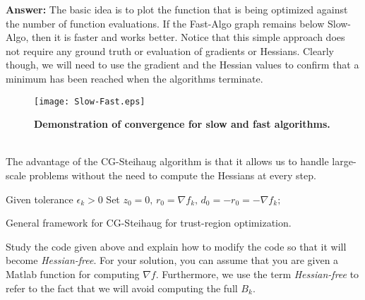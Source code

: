 \documentclass[12pt,legalpaper]{article}
\begin{document}
{\bf Answer:} The basic idea is to plot the function that is being optimized against the number of function evaluations.
If the {\rm Fast-Algo} graph remains below {\rm Slow-Algo}, then it is faster and works better. Notice that this simple approach
does not require any ground truth or evaluation of gradients or Hessians. Clearly though, we will need to use the gradient and the Hessian 
values to confirm that a minimum has been reached when the algorithms terminate.
\begin{figure}[htbp]
\begin{center}
\texttt{[image: Slow-Fast.eps]}
\caption{{\bf Demonstration of convergence for slow and fast algorithms.}}
\label{default}
\end{center}
\end{figure}
\newpage
{}\\
The advantage of the CG-Steihaug algorithm is that it allows us to handle large-scale problems without
   the need to compute the Hessians at every step.
        
\IncMargin{1em}
\LinesNumbered
\begin{algorithm}
  Given tolerance $\epsilon_k>0$\;
  Set $z_0=0, \, r_0=\nabla f_k, \, d_0=-r_0=-\nabla f_k; $\\
\caption{General framework for CG-Steihaug for trust-region optimization.}
\end{algorithm}
\DecMargin{1em}

  Study the code given above and explain
  how to modify the code so that it will become {\it Hessian-free}. For your solution,
  you can assume that you are given a Matlab function for computing $\nabla f$. Furthermore,
  we use the term {\it Hessian-free} to refer to the fact that we will avoid computing the full $B_k$.
  
\end{document}
